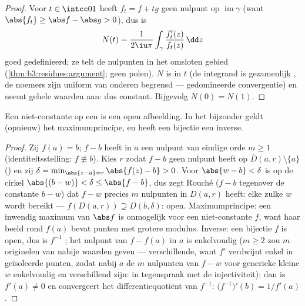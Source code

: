 \begin{proof}
Voor $t \in \intcc01$ heeft $f_t = f + tg$ geen nulpunt op
$\operatorname{im}\gamma$ (want $\abs{f_t} \geq \abs f - \abs g >
0$), dus is
\[
N(t) = \frac1{2\iu\pi}\int_\gamma
\frac{f_t'(z)}{f_t(z)}\,\dd z
\]
goed gedefinieerd; ze telt de nulpunten in het omsloten gebied
(\cref{thm:b3:residues:argument}; geen polen). $N$ is  in
$t$ (de integrand is gezamenlijk , de noemers zijn uniform
van onderen begrensd --- gedomineerde convergentie) en neemt
gehele waarden aan: dus constant. Bijgevolg $N(0) = N(1)$.
\end{proof}

\begin{corollary}
\label{cor:b3:residues:openmapping}
Een niet-constante  op een   is een open afbeelding. In het bijzonder geldt
(opnieuw) het maximumprincipe, en heeft een  bijectie
een  inverse.
\end{corollary}

\begin{proof}
Zij $f(a) = b$; $f - b$ heeft in $a$ een nulpunt van eindige orde
$m \geq 1$ (identiteitsstelling: $f \not\equiv b$). Kies $r$
zodat $f - b$ geen nulpunt heeft op $\bar D(a, r)\setminus\{a\}$
() en zij $\delta = \min_{\abs{z - a} =
r}\abs{f(z) - b} > 0$. Voor $\abs{w - b} < \delta$ is op de
cirkel $\abs{(b - w)} < \delta \leq \abs{f - b}$, dus zegt Rouché
($f - b$ tegenover de constante $b - w$) dat $f - w$ precies $m$
nulpunten in $D(a, r)$ heeft: elke zulke $w$ wordt bereikt ---
$f(D(a,r)) \supseteq D(b, \delta)$: open. Maximumprincipe: een
inwendig maximum van $\abs f$ is onmogelijk voor een
niet-constante $f$, want haar beeld rond $f(a)$ bevat punten met
grotere modulus. Inverse: een  bijectie $f$ is open, dus
is $f^{-1}$ ; het nulpunt van $f - f(a)$ in $a$ is
enkelvoudig ($m \geq 2$ zou $m$ originelen van nabije waarden
geven --- verschillende, want $f'$ verdwijnt enkel in
geïsoleerde punten, zodat nabij $a$ de $m$ nulpunten van $f - w$
voor generieke kleine $w$ enkelvoudig en verschillend zijn: in
tegenspraak met de injectiviteit); dan is $f'(a) \neq 0$ en
convergeert het differentiequotiënt van $f^{-1}$:
$\bigl(f^{-1}\bigr)'(b) = 1/f'(a)$.
\end{proof}

